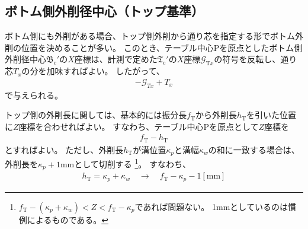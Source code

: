 \subsection{ボトム側外削径中心（トップ基準）}
ボトム側にも外削がある場合、トップ側外削から通り芯を指定する形でボトム外削の位置を決めることが多い。
このとき、テーブル中心Pを原点としたボトム側外削径中心$\mathfrak B_\mathrm c'$の$X$座標は、計測で定めた$\mathfrak T_\mathrm c'$の$X$座標$\mathcal G_{\mathrm Tx}$の符号を反転し、通り芯$T_x$の分を加味すればよい。
したがって、
\begin{align}
  \label{eq:TbasedTx}
  -\mathcal G_{Tx}+T_x
\end{align}
で与えられる。



\clearpage
トップ側の外削長に関しては、基本的には振分長$f_\mathrm T$から外削長$h_\mathrm T$を引いた位置に$Z$座標を合わせればよい。
すなわち、テーブル中心Pを原点として$Z$座標を
\begin{align*}
  f_\mathrm T - h_\mathrm T
\end{align*}
とすればよい。
ただし、外削長$h_\mathrm T$が溝位置$\kappa_p$と溝幅$\kappa_w$の和に一致する場合は、外削長を$\kappa_p+1$mmとして切削する
\footnote{$f_\mathrm T-(\kappa_p+\kappa_w) < Z < f_\mathrm T-\kappa_p$であれば問題ない。
1mmとしているのは慣例によるものである。}。
すなわち、
\begin{align*}
  h_\mathrm T = \kappa_p+\kappa_w \quad \longrightarrow \quad f_\mathrm T-\kappa_p-1[\mathrm{mm}]
\end{align*}










